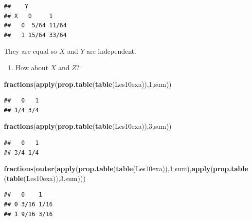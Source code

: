 \documentclass[]{book}
\newenvironment{Shaded}{\begin{snugshade}}{\end{snugshade}}
\newcommand{\KeywordTok}[1]{\textcolor[rgb]{0.13,0.29,0.53}{\textbf{#1}}}
\newcommand{\DecValTok}[1]{\textcolor[rgb]{0.00,0.00,0.81}{#1}}
\newcommand{\NormalTok}[1]{#1}
\providecommand{\tightlist}{%
  \setlength{\itemsep}{0pt}\setlength{\parskip}{0pt}}
\theoremstyle{definition}
\theoremstyle{definition}
\theoremstyle{definition}
\theoremstyle{remark}
\begin{document}
\begin{verbatim}
##    Y
## X   0     1    
##   0  5/64 11/64
##   1 15/64 33/64
\end{verbatim}

They are equal so \(X\) and \(Y\) are independent.

\begin{enumerate}
\def\labelenumi{\arabic{enumi}.}
\setcounter{enumi}{4}
\tightlist
\item
  How about \(X\) and \(Z\)?
\end{enumerate}

\begin{Shaded}
\begin{Highlighting}[]
\KeywordTok{fractions}\NormalTok{(}\KeywordTok{apply}\NormalTok{(}\KeywordTok{prop.table}\NormalTok{(}\KeywordTok{table}\NormalTok{(Les10exa)),}\DecValTok{1}\NormalTok{,sum))}
\end{Highlighting}
\end{Shaded}

\begin{verbatim}
##   0   1 
## 1/4 3/4
\end{verbatim}

\begin{Shaded}
\begin{Highlighting}[]
\KeywordTok{fractions}\NormalTok{(}\KeywordTok{apply}\NormalTok{(}\KeywordTok{prop.table}\NormalTok{(}\KeywordTok{table}\NormalTok{(Les10exa)),}\DecValTok{3}\NormalTok{,sum))}
\end{Highlighting}
\end{Shaded}

\begin{verbatim}
##   0   1 
## 3/4 1/4
\end{verbatim}

\begin{Shaded}
\begin{Highlighting}[]
\KeywordTok{fractions}\NormalTok{(}\KeywordTok{outer}\NormalTok{(}\KeywordTok{apply}\NormalTok{(}\KeywordTok{prop.table}\NormalTok{(}\KeywordTok{table}\NormalTok{(Les10exa)),}\DecValTok{1}\NormalTok{,sum),}\KeywordTok{apply}\NormalTok{(}\KeywordTok{prop.table}\NormalTok{(}\KeywordTok{table}\NormalTok{(Les10exa)),}\DecValTok{3}\NormalTok{,sum)))}
\end{Highlighting}
\end{Shaded}

\begin{verbatim}
##   0    1   
## 0 3/16 1/16
## 1 9/16 3/16
\end{verbatim}
\end{document}
